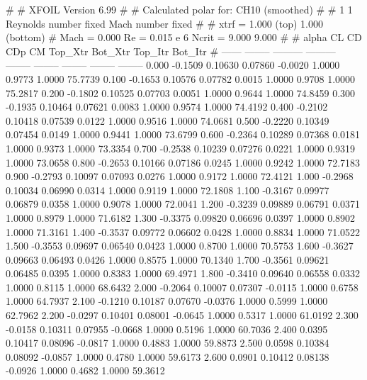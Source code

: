 #  
#       XFOIL         Version 6.99
#  
# Calculated polar for: CH10 (smoothed)                                 
#  
# 1 1 Reynolds number fixed          Mach number fixed         
#  
# xtrf =   1.000 (top)        1.000 (bottom)  
# Mach =   0.000     Re =     0.015 e 6     Ncrit =   9.000  9.000
#  
#   alpha    CL        CD       CDp       CM     Top_Xtr  Bot_Xtr  Top_Itr  Bot_Itr
#  ------ -------- --------- --------- -------- -------- -------- -------- --------
   0.000  -0.1509   0.10630   0.07860  -0.0020   1.0000   0.9773   1.0000  75.7739
   0.100  -0.1653   0.10576   0.07782   0.0015   1.0000   0.9708   1.0000  75.2817
   0.200  -0.1802   0.10525   0.07703   0.0051   1.0000   0.9644   1.0000  74.8459
   0.300  -0.1935   0.10464   0.07621   0.0083   1.0000   0.9574   1.0000  74.4192
   0.400  -0.2102   0.10418   0.07539   0.0122   1.0000   0.9516   1.0000  74.0681
   0.500  -0.2220   0.10349   0.07454   0.0149   1.0000   0.9441   1.0000  73.6799
   0.600  -0.2364   0.10289   0.07368   0.0181   1.0000   0.9373   1.0000  73.3354
   0.700  -0.2538   0.10239   0.07276   0.0221   1.0000   0.9319   1.0000  73.0658
   0.800  -0.2653   0.10166   0.07186   0.0245   1.0000   0.9242   1.0000  72.7183
   0.900  -0.2793   0.10097   0.07093   0.0276   1.0000   0.9172   1.0000  72.4121
   1.000  -0.2968   0.10034   0.06990   0.0314   1.0000   0.9119   1.0000  72.1808
   1.100  -0.3167   0.09977   0.06879   0.0358   1.0000   0.9078   1.0000  72.0041
   1.200  -0.3239   0.09889   0.06791   0.0371   1.0000   0.8979   1.0000  71.6182
   1.300  -0.3375   0.09820   0.06696   0.0397   1.0000   0.8902   1.0000  71.3161
   1.400  -0.3537   0.09772   0.06602   0.0428   1.0000   0.8834   1.0000  71.0522
   1.500  -0.3553   0.09697   0.06540   0.0423   1.0000   0.8700   1.0000  70.5753
   1.600  -0.3627   0.09663   0.06493   0.0426   1.0000   0.8575   1.0000  70.1340
   1.700  -0.3561   0.09621   0.06485   0.0395   1.0000   0.8383   1.0000  69.4971
   1.800  -0.3410   0.09640   0.06558   0.0332   1.0000   0.8115   1.0000  68.6432
   2.000  -0.2064   0.10007   0.07307  -0.0115   1.0000   0.6758   1.0000  64.7937
   2.100  -0.1210   0.10187   0.07670  -0.0376   1.0000   0.5999   1.0000  62.7962
   2.200  -0.0297   0.10401   0.08001  -0.0645   1.0000   0.5317   1.0000  61.0192
   2.300  -0.0158   0.10311   0.07955  -0.0668   1.0000   0.5196   1.0000  60.7036
   2.400   0.0395   0.10417   0.08096  -0.0817   1.0000   0.4883   1.0000  59.8873
   2.500   0.0598   0.10384   0.08092  -0.0857   1.0000   0.4780   1.0000  59.6173
   2.600   0.0901   0.10412   0.08138  -0.0926   1.0000   0.4682   1.0000  59.3612
